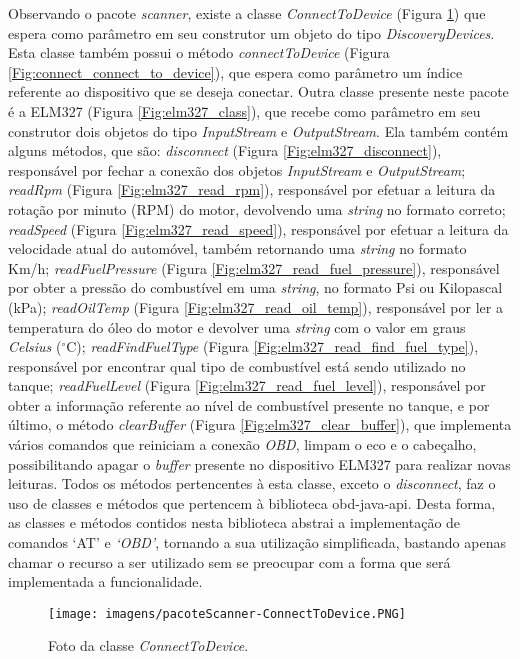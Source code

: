 Observando o pacote \textit{scanner}, existe a classe \textit{ConnectToDevice} (Figura \ref{Fig:connect_to_device}) que espera como parâmetro em seu construtor um objeto do tipo \textit{DiscoveryDevices}. Esta classe também possui o método \textit{connectToDevice} (Figura \ref{Fig:connect_connect_to_device}), que espera como parâmetro um índice referente ao dispositivo que se deseja conectar. Outra classe presente neste pacote é a ELM327 (Figura \ref{Fig:elm327_class}), que recebe como parâmetro em seu construtor dois objetos do tipo \textit{InputStream} e \textit{OutputStream}. Ela também contém alguns métodos, que são: \textit{disconnect} (Figura \ref{Fig:elm327_disconnect}), responsável por fechar a conexão dos objetos \textit{InputStream} e \textit{OutputStream}; \textit{readRpm} (Figura \ref{Fig:elm327_read_rpm}), responsável por efetuar a leitura da rotação por minuto (RPM) do motor, devolvendo uma \textit{string} no formato correto; \textit{readSpeed} (Figura \ref{Fig:elm327_read_speed}), responsável por efetuar a leitura da velocidade atual do automóvel, também retornando uma \textit{string} no formato Km/h; \textit{readFuelPressure} (Figura \ref{Fig:elm327_read_fuel_pressure}), responsável por obter a pressão do combustível em uma \textit{string}, no formato Psi ou Kilopascal (kPa); \textit{readOilTemp} (Figura \ref{Fig:elm327_read_oil_temp}), responsável por ler a temperatura do óleo do motor e devolver uma \textit{string} com o valor em graus \textit{Celsius} ($^{\circ}$C); \textit{readFindFuelType} (Figura \ref{Fig:elm327_read_find_fuel_type}), responsável por encontrar qual tipo de combustível está sendo utilizado no tanque; \textit{readFuelLevel} (Figura \ref{Fig:elm327_read_fuel_level}), responsável por obter a informação referente ao nível de combustível presente no tanque, e por último, o método \textit{clearBuffer} (Figura \ref{Fig:elm327_clear_buffer}), que implementa vários comandos que reiniciam a conexão \textit{OBD}, limpam o eco e o cabeçalho, possibilitando apagar o \textit{buffer} presente no dispositivo ELM327 para realizar novas leituras. Todos os métodos pertencentes à esta classe, exceto o \textit{disconnect}, faz o uso de classes e métodos que pertencem à biblioteca obd-java-api. Desta forma, as classes e métodos contidos nesta biblioteca abstrai a implementação de comandos ‘AT’ e \textit{‘OBD’}, tornando a sua utilização simplificada, bastando apenas chamar o recurso a ser utilizado sem se preocupar com a forma que será implementada a funcionalidade.

\begin{figure}[!ht]
\centering
\caption{Foto da classe \textit{ConnectToDevice}.} 
{\texttt{[image: imagens/pacoteScanner-ConnectToDevice.PNG]}}\\
 \label{Fig:connect_to_device}
\end{figure}


